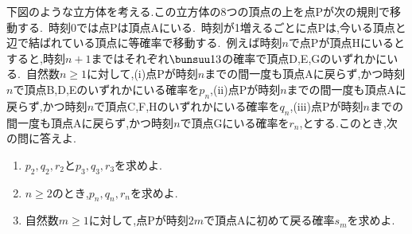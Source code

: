 \begin{problem}
下図のような立方体を考える.この立方体の8つの頂点の上を点Pが次の規則で移動する.\, 時刻0では点Pは頂点Aにいる.\, 時刻が1増えるごとに点Pは,今いる頂点と辺で結ばれている頂点に等確率で移動する.\, 例えば時刻$n$で点Pが頂点Hにいるとすると,時刻$n+1$まではそれぞれ$\bunsuu13$の確率で頂点D,E,Gのいずれかにいる.\, 自然数$n \geq 1$に対して,(i)点Pが時刻$n$までの間一度も頂点Aに戻らず,かつ時刻$n$で頂点B,D,Eのいずれかにいる確率を$p_n$,(ii)点Pが時刻$n$までの間一度も頂点Aに戻らず,かつ時刻$n$で頂点C,F,Hのいずれかにいる確率を$q_n$,(iii)点Pが時刻$n$までの間一度も頂点Aに戻らず,かつ時刻$n$で頂点Gにいる確率を$r_n$,とする.このとき,次の問に答えよ.
  \begin{enumerate}[(1)\ ]
    \item $p_2,q_2,r_2$と$p_3,q_3,r_3$を求めよ.
    \item $n \geq 2$のとき,$p_n,q_n,r_n$を求めよ.
    \item 自然数$m \geq 1$に対して,点Pが時刻$2m$で頂点Aに初めて戻る確率$s_m$を求めよ.
  \end{enumerate}
\end{problem}
